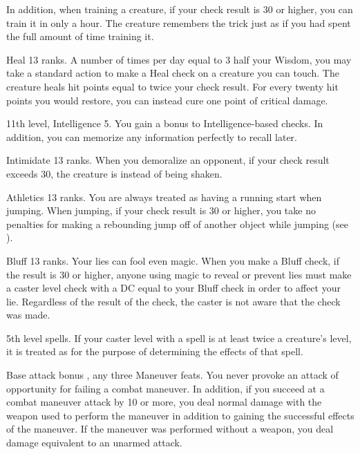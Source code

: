 In addition, when training a creature, if your check result is 30 or higher, you can train it in only a hour. The creature remembers the trick just as if you had spent the full amount of time training it.

\featpre Heal 13 ranks.
\featben A number of times per day equal to 3 \add half your Wisdom, you may take a standard action to make a Heal check on a creature you can touch. The creature heals hit points equal to twice your check result. For every twenty hit points you would restore, you can instead cure one point of critical damage.

\featpre 11th level, Intelligence 5.
\featben You gain a  bonus to Intelligence-based checks. In addition, you can memorize any information perfectly to recall later.

\featpre Intimidate 13 ranks.
\featben When you demoralize an opponent, if your check result exceeds 30, the creature is \frightened instead of being shaken.

\featpre Athletics 13 ranks.
\featben You are always treated as having a running start when jumping. When jumping, if your check result is 30 or higher, you take no penalties for making a rebounding jump off of another object while jumping (see ).

\featpre Bluff 13 ranks.
\featben Your lies can fool even magic. When you make a Bluff check, if the result is 30 or higher, anyone using magic to reveal or prevent lies must make a caster level check with a DC equal to your Bluff check in order to affect your lie. Regardless of the result of the check, the caster is not aware that the check was made.

\featpre 5th level spells.
\featben If your caster level with a spell is at least twice a creature's level, it is treated as \bloodied for the purpose of determining the effects of that spell.

\featpre Base attack bonus , any three Maneuver feats.
\featben You never provoke an attack of opportunity for failing a combat maneuver. In addition, if you succeed at a combat maneuver attack by 10 or more, you deal normal damage with the weapon used to perform the maneuver in addition to gaining the successful effects of the maneuver. If the maneuver was performed without a weapon, you deal damage equivalent to an unarmed attack.

